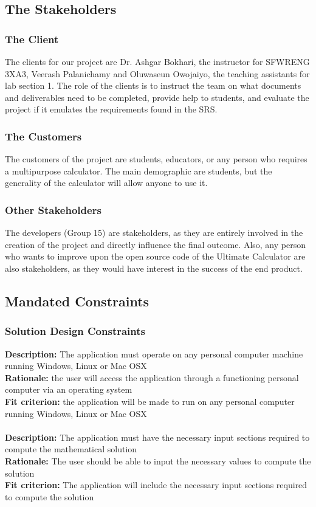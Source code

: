 \documentclass[12pt, titlepage]{article}
\begin{document}
\subsection{The Stakeholders}

\subsubsection{The Client}
The clients for our project are Dr. Ashgar Bokhari, the instructor for SFWRENG 3XA3, Veerash Palanichamy and Oluwaseun Owojaiyo, the teaching assistants for lab section 1. The role of the clients is to instruct the team on what documents and deliverables need to be completed, provide help to students, and evaluate the project if it emulates the requirements found in the SRS.

\subsubsection{The Customers}
The customers of the project are students, educators, or any person who requires a multipurpose calculator. The main demographic are students, but the generality of the calculator will allow anyone to use it.
\subsubsection{Other Stakeholders}
The developers (Group 15) are stakeholders, as they are entirely involved in the creation of the project and directly influence the final outcome. Also, any person who wants to improve upon the open source code of the Ultimate Calculator are also stakeholders, as they would have interest in the success of the end product.
\subsection{Mandated Constraints}

\subsubsection{Solution Design Constraints}
\textbf{Description:} The application must operate on any personal computer machine running 
Windows, Linux or Mac OSX\\ 
\textbf{Rationale:} the user will access the application through a functioning personal computer via an operating system\\
\textbf{Fit criterion:} the application will be made to run on any personal computer running Windows, Linux or Mac OSX
\medskip\\
\\
\textbf{Description:} The application must have the necessary input sections required to compute the mathematical solution\\
\textbf{Rationale:} The user should be able to input the necessary values to compute the solution\\
\textbf{Fit criterion:} The application will include the necessary input sections required to compute the solution
\end{document}

